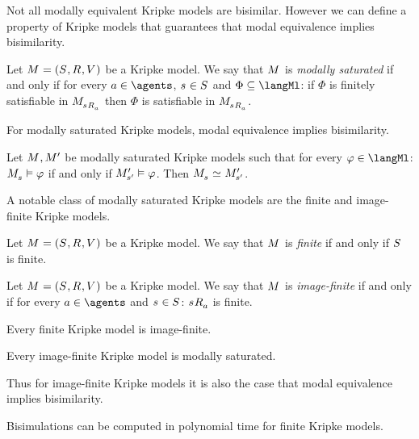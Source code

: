 Not all modally equivalent Kripke models are bisimilar.
However we can define a property of Kripke models that guarantees that modal equivalence implies bisimilarity.

\begin{definition}
Let $\kModelAndTuple$ be a Kripke model.
We say that $\kModel$ is {\em modally saturated} if and only if for every $\agentA \in \agents$, $\kStateS \in \kStates$ and $\Phi \subseteq \langMl$: if $\Phi$ is finitely satisfiable in $\kPModel{\kSuccessorsA{\kStateS}}$ then $\Phi$ is satisfiable in $\kPModel{\kSuccessorsA{\kStateS}}$.
\end{definition}

For modally saturated Kripke models, modal equivalence implies bisimilarity.

\begin{proposition}
Let $\kModel, \kModelP$ be modally saturated Kripke models such that for every $\phi \in \langMl$: $\kPModel{\kStateS} \entails \phi$ if and only if ${M^{\prime}_{{{s}^{\prime}}}} \vDash \varphi$.
Then $\kPModel{\kStateS} \bisimilar \kPModelP{\kStateSP}$.
\end{proposition}

A notable class of modally saturated Kripke models are the finite and image-finite Kripke models.

\begin{definition}
Let $\kModelAndTuple$ be a Kripke model.
We say that $\kModel$ is {\em finite} if and only if $\kStates$ is finite.
\end{definition}

\begin{definition}
Let $\kModelAndTuple$ be a Kripke model.
We say that $\kModel$ is {\em image-finite} if and only if for every $\agentA \in \agents$ and $\kStateS \in \kStates$: $\kSuccessorsA{\kStateS}$ is finite.
\end{definition}

\begin{proposition}
Every finite Kripke model is image-finite.
\end{proposition}

\begin{proposition}
Every image-finite Kripke model is modally saturated.
\end{proposition}

Thus for image-finite Kripke models it is also the case that modal equivalence implies bisimilarity.

Bisimulations can be computed in polynomial time for finite Kripke models.

